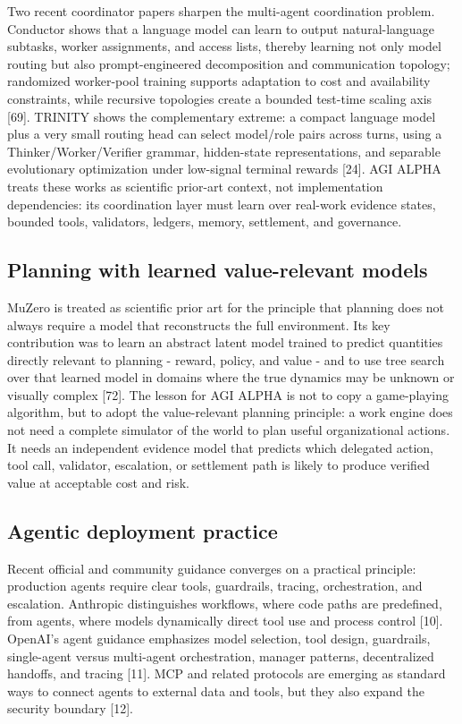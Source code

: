 \documentclass[11pt]{article}
\begin{document}
Two recent coordinator papers sharpen the multi-agent coordination problem. Conductor shows that a language model can learn to output natural-language subtasks, worker assignments, and access lists, thereby learning not only model routing but also prompt-engineered decomposition and communication topology; randomized worker-pool training supports adaptation to cost and availability constraints, while recursive topologies create a bounded test-time scaling axis {[}69{]}. TRINITY shows the complementary extreme: a compact language model plus a very small routing head can select model/role pairs across turns, using a Thinker/Worker/Verifier grammar, hidden-state representations, and separable evolutionary optimization under low-signal terminal rewards {[}24{]}. AGI ALPHA treats these works as scientific prior-art context, not implementation dependencies: its coordination layer must learn over real-work evidence states, bounded tools, validators, ledgers, memory, settlement, and governance.

\subsection{Planning with learned value-relevant models}\label{planning-with-learned-value-relevant-models}

MuZero is treated as scientific prior art for the principle that planning does not always require a model that reconstructs the full environment. Its key contribution was to learn an abstract latent model trained to predict quantities directly relevant to planning - reward, policy, and value - and to use tree search over that learned model in domains where the true dynamics may be unknown or visually complex {[}72{]}. The lesson for AGI ALPHA is not to copy a game-playing algorithm, but to adopt the value-relevant planning principle: a work engine does not need a complete simulator of the world to plan useful organizational actions. It needs an independent evidence model that predicts which delegated action, tool call, validator, escalation, or settlement path is likely to produce verified value at acceptable cost and risk.

\subsection{Agentic deployment practice}\label{agentic-deployment-practice}

Recent official and community guidance converges on a practical principle: production agents require clear tools, guardrails, tracing, orchestration, and escalation. Anthropic distinguishes workflows, where code paths are predefined, from agents, where models dynamically direct tool use and process control {[}10{]}. OpenAI's agent guidance emphasizes model selection, tool design, guardrails, single-agent versus multi-agent orchestration, manager patterns, decentralized handoffs, and tracing {[}11{]}. MCP and related protocols are emerging as standard ways to connect agents to external data and tools, but they also expand the security boundary {[}12{]}.
\end{document}
